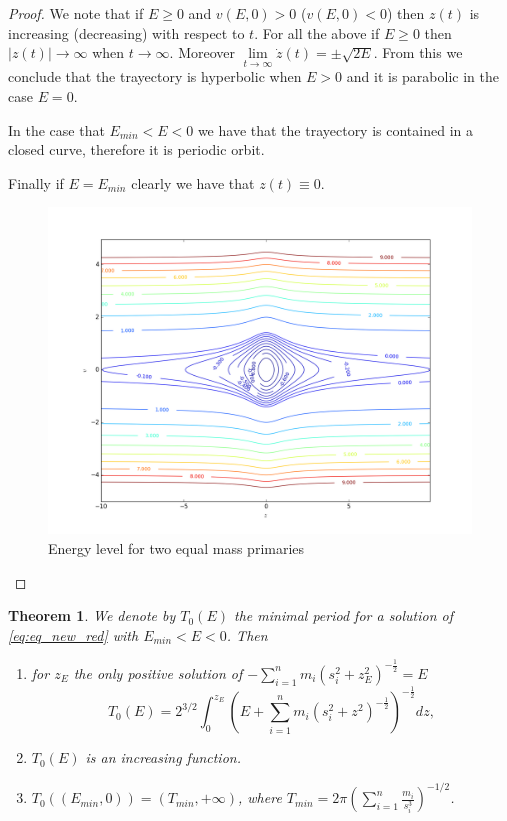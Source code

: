 \documentclass[twoside]{article}
\newtheorem{thm}{Theorem}[section]
\theoremstyle{remark}
\begin{document}
\begin{proof}
We note that if $E\geq 0$ and $v(E,0)>0$ ($v(E,0)<0$) then $z(t)$ is increasing (decreasing) with respect to $t$. For all the above if $E\geq 0$ then $|z(t)|\to \infty$ when $t\to \infty$. Moreover $\lim\limits_{t\to\infty}\dot{z}(t)=\pm\sqrt{2E}$.  From this we conclude that the trayectory is hyperbolic when $E>0$ and it is parabolic in the case $E=0$.

In the case that $E_{min}<E<0$ we have that the trayectory is contained in a closed curve, therefore it is periodic orbit.

Finally if $E=E_{min}$ clearly we have that $z(t)\equiv 0$.
\begin{figure}[h]
\begin{center}
\includegraphics[scale=0.3]{figure_1.png}
\caption{Energy level for two equal mass primaries}\label{fig:energy}
\end{center}
\end{figure}
\end{proof}

\begin{thm}\label{thm:prop.periodos}
We denote by $T_0(E)$ the minimal period for a solution of \eqref{eq:eq_new_red} with $E_{min}<E<0$. Then
\begin{enumerate}
 \item\label{it:T0.formula} for $z_E$ the only positive solution of $-\sum_{i=1}^n m_i (s_i^2+z_{E}^2)^{-\frac12}=E$
 \begin{equation}\label{eq:form.T0E-periodo}
 T_0(E)=2^{3/2}\int_{0}^{z_E} \left(E+\sum_{i=1}^n m_i (s_i^2+z^2)^{-\frac12}\right)^{-\frac12} dz,
 \end{equation}
 \item\label{it:T0.creciente} $T_0(E)$ is an increasing function.
 \item\label{it:T0.rango} $T_0\left((E_{min},0)\right)=(T_{min},+\infty)$, where  $T_{min}=2\pi\left(\sum_{i=1}^n\frac{m_i}{s_i^3} \right)^{-1/2}$.

 \end{enumerate}
\end{thm}
\end{document}
